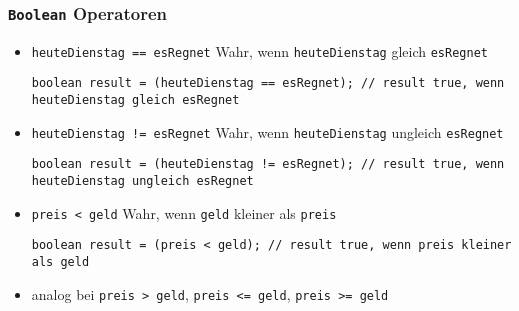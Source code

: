 \documentclass{../../presentation}
\begin{document}
\begin{frame}[fragile]
  \frametitle{\texttt{Boolean} Operatoren}
  \pause

  \begin{itemize}
    \item<2->\texttt{heuteDienstag == esRegnet} Wahr, wenn \texttt{heuteDienstag} gleich \texttt{esRegnet}
          \begin{verbatim}
boolean result = (heuteDienstag == esRegnet); // result true, wenn heuteDienstag gleich esRegnet
    \end{verbatim}

    \item<3->\texttt{heuteDienstag != esRegnet} Wahr, wenn \texttt{heuteDienstag} ungleich \texttt{esRegnet}
          \begin{verbatim}
boolean result = (heuteDienstag != esRegnet); // result true, wenn heuteDienstag ungleich esRegnet
    \end{verbatim}

    \item<4->\texttt{preis < geld} Wahr, wenn \texttt{geld} kleiner als \texttt{preis}
          \begin{verbatim}
boolean result = (preis < geld); // result true, wenn preis kleiner als geld
    \end{verbatim}

    \item<5->analog bei \texttt{preis > geld}, \texttt{preis <= geld}, \texttt{preis >= geld}
  \end{itemize}
\end{frame}
\end{document}
